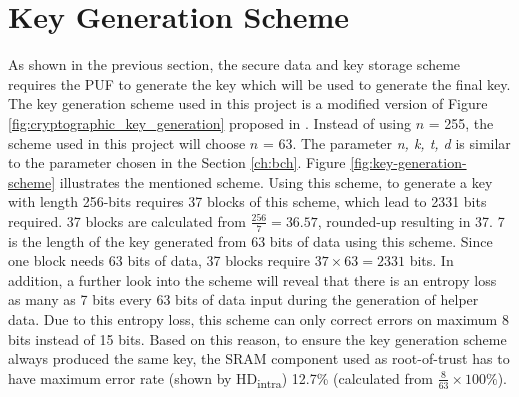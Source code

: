 
\section{Key Generation Scheme}\label{ch:key_generation_scheme}

As shown in the previous section, the secure data and key storage scheme requires the PUF to generate the key which will be used to generate the final key. The key generation scheme used in this project is a modified version of Figure \ref{fig:cryptographic_key_generation} proposed in \cite{cryptographic_key_generation}. Instead of using $n$ = 255, the scheme used in this project will choose $n$ = 63. The parameter \textit{n, k, t, d} is similar to the parameter chosen in the Section \ref{ch:bch}. Figure \ref{fig:key-generation-scheme} illustrates the mentioned scheme.
Using this scheme, to generate a key with length 256-bits requires 37 blocks of this scheme, which lead to 2331 bits required. 37 blocks are calculated from $\frac{256}{7}=36.57$, rounded-up resulting in 37. 7 is the length of the key generated from 63 bits of data using this scheme. Since one block needs 63 bits of data, 37 blocks require $37\times63=2331$ bits.
In addition, a further look into the scheme will reveal that there is an entropy loss as many as 7 bits every 63 bits of data input during the generation of helper data. Due to this entropy loss, this scheme can only correct errors on maximum 8 bits instead of 15 bits. Based on this reason, to ensure the key generation scheme always produced the same key, the SRAM component used as root-of-trust has to have maximum error rate (shown by HD\textsubscript{intra}) 12.7\% (calculated from $\frac{8}{63}\times100\%$).

